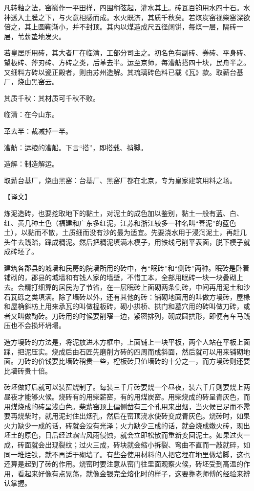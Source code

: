 \documentclass[12pt,UTF8]{ctexbook}
\begin{document}
凡转釉之法，窑巅作一平田样，四围稍弦起，灌水其上。砖瓦百钧用水四十石。水神透入土膜之下，与火意相感而成。水火既济，其质千秋矣。若煤炭窑视柴窑深欲倍之，其上圆鞠渐小，并不封顶。其内以煤造成尺五径阔饼，每煤一层，隔砖一层，苇薪垫地发火。

若皇居所用砖，其大者厂在临清，工部分司主之。初名色有副砖、券砖、平身砖、望板砖、斧刃砖、方砖之类，后革去半。运至京师，每漕舫搭四十块，民舟半之。又细料方砖以瓷正殿者，则由苏州造解。其琉璃砖色料已载《瓦》款。取薪台基厂，烧由黑窑云。

其质千秋：其材质可千秋不败。

临清：在今山东。

革去半：裁减掉一半。

漕舫：运粮的漕船。下言“搭”，即搭载、捎脚。

造解：制造解运。

取薪台基厂，烧由黑窑：台基厂、黑窑厂都在北京，专为皇家建筑用料之场。

【译文】

炼泥造砖，也要挖取地下的黏土，对泥土的成色加以鉴别，黏土一般有蓝、白、红、黄几种土色（福建和广东多红泥，江苏和浙江较多一种名叫“善泥”的蓝色土），以黏而不散，土质细而没有沙的最为适宜。先要浇水用于浸润泥土，再赶几头牛去践踏，踩成稠泥。然后把稠泥填满木模子，用铁线弓削平表面，脱下模子就成砖坯了。

建筑各郡县的城墙和民房的院墙所用的砖中，有“眠砖”和“侧砖”两种。眠砖是卧着铺砌的，郡县的城墙和有钱人家的墙壁，不惜工本，全部用眠砖一块一块叠砌上去。会精打细算的居民为了节省，在一层眠砖上面砌两条侧砖，中间再用泥土和沙石瓦砾之类填满。除了墙砖以外，还有其他的砖：铺砌地面用的叫做方墁砖，屋椽和屋桷斜枋上用来承瓦的叫做楻板砖，砌小拱桥、拱门和墓穴用的砖叫做刀砖，或者又叫做鞠砖。刀砖用的时候要削窄一边，紧密排列，砌成圆拱形，即便有车马践压也不会损坏坍塌。

造方墁砖的方法是，将泥放进木方框中，上面铺上一块平板，两个人站在平板上面踩，把泥压实。烧成后由石匠先磨削方砖的四周而成斜面，然后就可以用来铺砌地面。刀砖的价钱要比墙砖稍贵一些，楻板砖只值墙砖的十分之一，而方墁砖则还要比墙砖贵十倍。

砖坯做好后就可以装窑烧制了。每装三千斤砖要烧一个昼夜，装六千斤则要烧上两昼夜才能够火候。烧砖有的用柴薪窑，有的用煤炭窑。用柴烧成的砖呈青灰色，而用煤烧成的砖呈浅白色。柴薪窑顶上偏侧凿有三个孔用来出烟，当火候已足而不需要再烧柴时，就用泥封住出烟孔，然后在窑顶浇水使砖变成青灰色。烧砖时，如果火力缺少一成的话，砖就会没有光泽；火力缺少三成的话，就会烧成嫩火砖，现出坯土的原色，日后经过霜雪风雨侵蚀，就会立即松散而重新变回泥土。如果过火一成，砖面就会出现裂纹；过火三成，砖块就会缩小拆裂、弯曲不直而一敲就碎，如同一堆烂铁，就不再适于砌墙了。有些会使用材料的人把它埋在地里做墙脚，这也还算是起到了砖的作用。烧窑时要注意从窑门往里面观察火候，砖坯受到高温的作用，看起来好像有点晃荡，就像金银完全熔化时的样子，这要靠老师傅的经验来辨认掌握。
\end{document}
